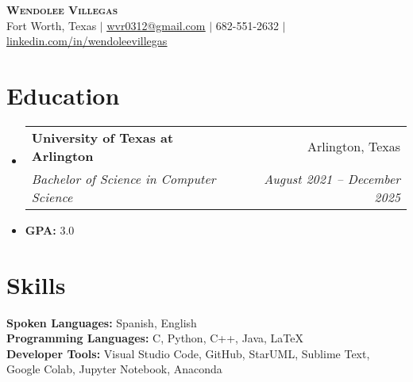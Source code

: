 \documentclass[letterpaper,11pt]{article}
\makeatletter
\newcommand{\resumeItem}[1]{
  \item\small{
    {#1 \vspace{-2pt}}
  }
}
\newcommand{\resumeSubheading}[4]{
  \vspace{-2pt}\item
    \begin{tabular*}{0.97\textwidth}[t]{l@{\extracolsep{\fill}}r}
      \textbf{#1} & #2 \\
      \textit{\small#3} & \textit{\small #4} \\
    \end{tabular*}\vspace{-7pt}
}
\newcommand{\resumeSubHeadingListStart}{\begin{itemize}[leftmargin=0.15in, label={}]}
\newcommand{\resumeSubHeadingListEnd}{\end{itemize}}
\makeatother
\begin{document}

\begin{center}
    \textbf{\Huge \scshape Wendolee Villegas} \\ \vspace{1pt}
    \small Fort Worth, Texas $|$ \href{mailto:x@x.com}{\underline{wvr0312@gmail.com}} $|$ \small 682-551-2632
    $|$ \href{https://linkedin.com/in/wendolee-villegas-565440252/}{\underline{linkedin.com/in/wendoleevillegas}}
\end{center}



\section{Education}
  \resumeSubHeadingListStart
    \resumeSubheading
      {University of Texas at Arlington}{Arlington, Texas}
      {Bachelor of Science in Computer Science}{August 2021 -- December 2025}
      \resumeItem{\textbf{GPA:} 3.0}
  \resumeSubHeadingListEnd

\section{Skills}
 \begin{itemize}[leftmargin=0.15in, label={}]
    \small{\item{
      \textbf{Spoken Languages:}{ Spanish, English} \\
      \textbf{Programming Languages:}{ C, Python, C++, Java, LaTeX} \\
      \textbf{Developer Tools:}{ Visual Studio Code, GitHub, StarUML, Sublime Text, Google Colab, Jupyter Notebook, Anaconda} \\
     }}
 \end{itemize}
\end{document}
